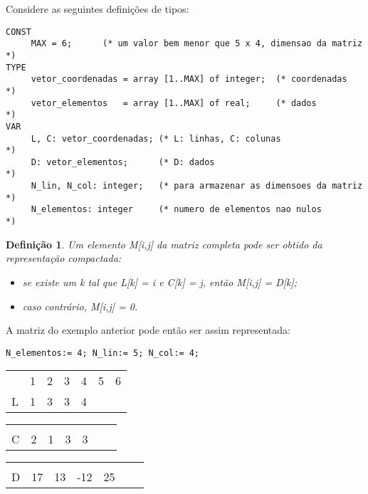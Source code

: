 Considere as seguintes definições de tipos:
\begin{lstlisting}
CONST
     MAX = 6;      (* um valor bem menor que 5 x 4, dimensao da matriz *) 
TYPE 
     vetor_coordenadas = array [1..MAX] of integer;  (* coordenadas    *)
     vetor_elementos   = array [1..MAX] of real;     (* dados          *)
VAR
     L, C: vetor_coordenadas; (* L: linhas, C: colunas                 *)
     D: vetor_elementos;      (* D: dados                              *)
     N_lin, N_col: integer;   (* para armazenar as dimensoes da matriz *)
     N_elementos: integer     (* numero de elementos nao nulos         *)
\end{lstlisting}


\newtheorem{definicao}{Definição}

\begin{definicao}
\label{def1}
Um elemento M[i,j] da matriz completa pode ser 
obtido da representação compactada: 

\begin{itemize}
\item se existe um k tal que L[k] = i e C[k] = j, então M[i,j] = D[k];
\item caso contrário, M[i,j] = 0.
\end{itemize} 
\end{definicao}

A matriz do exemplo anterior pode então ser assim representada:

\begin{verbatim}
N_elementos:= 4; N_lin:= 5; N_col:= 4;
\end{verbatim}

\begin{center}
\begin{tabular}{c|p{.6cm}|p{.6cm}|p{.6cm}|p{.6cm}|p{.6cm}|p{.6cm}|} 
\multicolumn{1}{c}{} & \multicolumn{1}{c}{1} & \multicolumn{1}{c}{2} & \multicolumn{1}{c}{
3} & \multicolumn{1}{c}{4} & \multicolumn{1}{c}{5} & \multicolumn{1}{c}{6}\\ \cline{2-7}
L & 1  & 3  & 3   & 4 & & \\ \cline{2-7}
\end{tabular}


\begin{tabular}{c|p{.6cm}|p{.6cm}|p{.6cm}|p{.6cm}|p{.6cm}|p{.6cm}|} 
\multicolumn{1}{c}{} & \multicolumn{1}{c}{} & \multicolumn{1}{c}{} & \multicolumn{1}{c}{} 
& \multicolumn{1}{c}{} & \multicolumn{1}{c}{} & \multicolumn{1}{c}{}\\ \cline{2-7}
C & 2  & 1  & 3   & 3 & & \\ \cline{2-7}
\end{tabular}

\begin{tabular}{c|p{.6cm}|p{.6cm}|p{.6cm}|p{.6cm}|p{.6cm}|p{.6cm}|} 
\multicolumn{1}{c}{} & \multicolumn{1}{c}{} & \multicolumn{1}{c}{} & \multicolumn{1}{c}{} 
& \multicolumn{1}{c}{} & \multicolumn{1}{c}{} & \multicolumn{1}{c}{}\\ \cline{2-7}
D & 17  & 13  & -12   & 25 & & \\ \cline{2-7}
\end{tabular}
\end{center}

